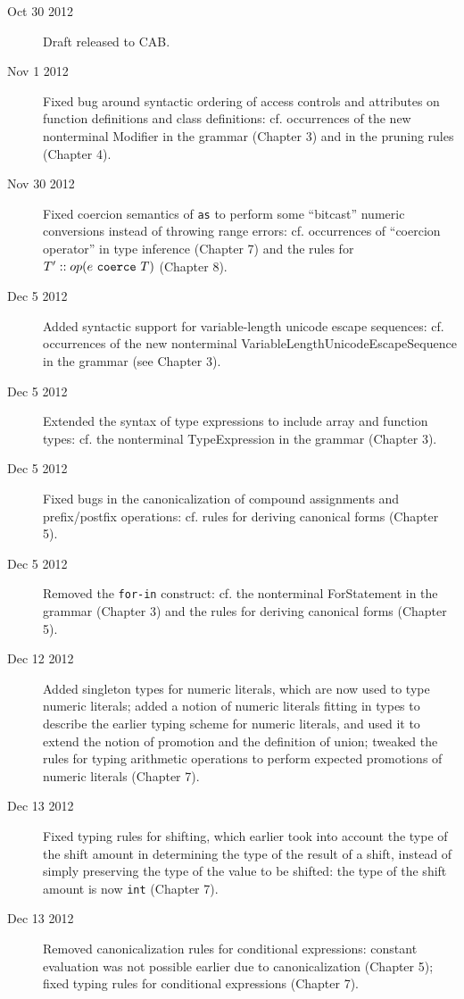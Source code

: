 \makeatletter{}\documentclass[10pt,oneside]{book}
\newcommand{\nonterminal}[1]{{\slantsf #1}}
\newcommand{\lexicalnonterminal}[1]{{\sf #1}}
\theoremstyle{note}
\begin{document}
\begin{description}

\item[Oct 30 2012] Draft released to CAB.

\item[Nov 1 2012] Fixed bug around syntactic ordering of access controls and
  attributes on function definitions and class definitions: cf.
  occurrences of the new nonterminal \nonterminal{Modifier} in the grammar (Chapter
  3) and in the pruning rules (Chapter 4).

\item[Nov 30 2012] Fixed coercion semantics of \verb'as' to perform
  some ``bitcast'' numeric conversions instead of throwing range
  errors: cf. occurrences of ``coercion operator'' in
  type inference (Chapter 7) and the rules for $T'::op(e~{\tt
    coerce}~T)$ (Chapter 8).

\item[Dec 5 2012] Added syntactic support for variable-length unicode
  escape sequences: cf. occurrences of the new nonterminal \lexicalnonterminal{VariableLengthUnicodeEscapeSequence} in the grammar (see Chapter 3).

\item[Dec 5 2012] Extended the syntax of type expressions to include
  array and function types: cf. the nonterminal
  \nonterminal{TypeExpression} in the grammar (Chapter 3).

\item[Dec 5 2012] Fixed bugs in the canonicalization of compound
  assignments and
  prefix/postfix operations: cf. rules for deriving canonical forms (Chapter 5).

\item[Dec 5 2012] Removed the \verb'for-in' construct: cf. the
  nonterminal \nonterminal{ForStatement} in the grammar (Chapter 3)
  and the rules for deriving canonical forms (Chapter 5).

\item[Dec 12 2012] Added singleton types for numeric literals, which
  are now used to type numeric literals; added a notion of numeric
  literals fitting in types to describe the earlier typing scheme
  for numeric literals, and used it to
  extend the notion of promotion and the definition of union; tweaked the rules for typing
  arithmetic operations to perform expected promotions of numeric
  literals (Chapter 7).

\item[Dec 13 2012] Fixed typing rules for shifting, which earlier took
  into account the type of the shift amount in determining the type of the
  result of a shift, instead of simply preserving the type of the value to be
  shifted: the type of the shift amount is now {\tt int} (Chapter 7).

\item[Dec 13 2012] Removed canonicalization rules for conditional
  expressions: constant evaluation
  was not possible earlier due to canonicalization (Chapter 5); fixed
  typing rules for conditional expressions (Chapter 7).

\end{description}
\end{document}

